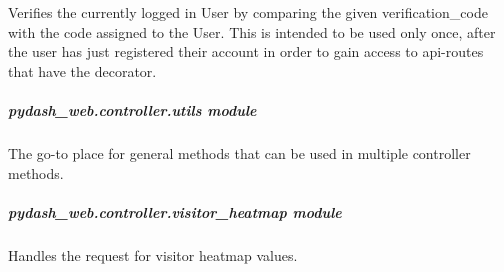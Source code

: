 \documentclass[letterpaper,10pt,english]{sphinxmanual}
\begin{document}
\begin{fulllineitems}
\label{\detokenize{pydash_web.controller.user_verification:pydash_web.controller.user_verification.verify_user}}
Verifies the currently logged in User by comparing the given verification\_code with the code assigned to the User.
This is intended to be used only once, after the user has just registered their account in order to gain access to
api-routes that have the  decorator.

\end{fulllineitems}



\subparagraph{pydash\_web.controller.utils module}
\label{\detokenize{pydash_web.controller.utils:module-pydash_web.controller.utils}}\label{\detokenize{pydash_web.controller.utils:pydash-web-controller-utils-module}}\label{\detokenize{pydash_web.controller.utils::doc}}
The go-to place for general methods that can be used in multiple controller methods.

\begin{fulllineitems}
\label{\detokenize{pydash_web.controller.utils:pydash_web.controller.utils.execution_times}}
\end{fulllineitems}



\subparagraph{pydash\_web.controller.visitor\_heatmap module}
\label{\detokenize{pydash_web.controller.visitor_heatmap:module-pydash_web.controller.visitor_heatmap}}\label{\detokenize{pydash_web.controller.visitor_heatmap:pydash-web-controller-visitor-heatmap-module}}\label{\detokenize{pydash_web.controller.visitor_heatmap::doc}}
Handles the request for visitor heatmap values.

\begin{fulllineitems}
\label{\detokenize{pydash_web.controller.visitor_heatmap:pydash_web.controller.visitor_heatmap.daterange}}
\end{fulllineitems}
\end{document}
